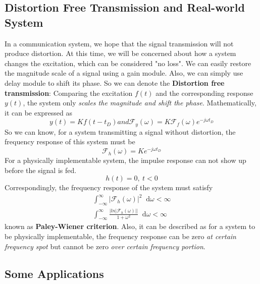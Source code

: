 \documentclass[margin,line]{res}
\newcommand*{\dif}{\mathop{}\!\mathrm{d}}
\begin{document}
\begin{resume}
\subsection{\textbf{Distortion Free Transmission and Real-world System}}
In a communication system, we hope that the signal transmission will not produce distortion. At this time, we will be concerned about how a system changes the excitation, which can be considered "no loss". We can easily restore the magnitude scale of a signal using a gain module. Also, we can simply use delay module to shift its phase. So we can denote the \textbf{Distortion free transmission}: Comparing the excitation $f(t)$ and the corresponding response $y(t)$, the system only \textit{scales the magnitude and shift the phase}. Mathematically, it can be expressed as
$$
y(t) = Kf(t-t_D) and \mathscr{F}_y(\omega) = K\mathscr{F}_f(\omega)e^{-j\omega t_D}
$$
So we can know, for a system transmitting a signal without distortion, the frequency response of this system must be
$$
\mathscr{F}_h(\omega) = Ke^{-j\omega t_D}
$$
For a physically implementable system, the impulse response can not show up before the signal is fed.
$$
h(t) =0, \ t < 0
$$
Correspondingly, the frequency response of the system must satisfy
\begin{align}
\int_{-\infty}^{\infty} \left|\mathscr{F}_h(\omega)\right|^2 \dif \omega < \infty \nonumber \\ 
\int_{-\infty}^{\infty} \frac{\left| ln \left| \mathscr{F}_h(\omega) \right| \right|}{1+\omega^2} \dif \omega < \infty \nonumber
\end{align}
known as \textbf{Paley-Wiener criterion}. Also, it can be described as for a system to be physically implementable, the frequency response can be zero \textit{at certain frequency spot} but cannot be zero \textit{over certain frequency portion}.
\subsection{\textbf{Some Applications}}

\end{resume}
\end{document}
